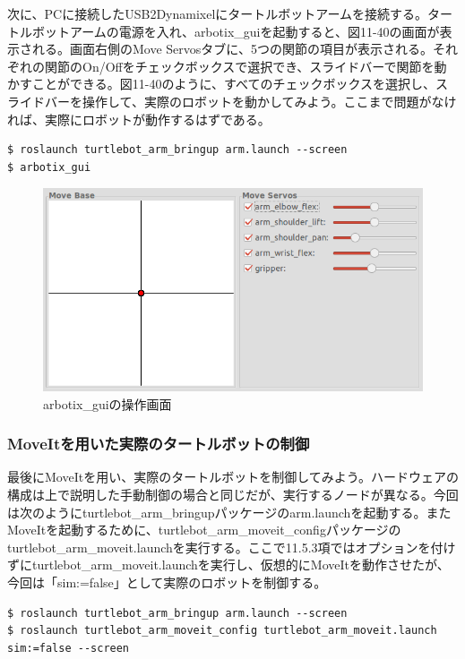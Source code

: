 次に、PCに接続したUSB2Dynamixelにタートルボットアームを接続する。タートルボットアームの電源を入れ、arbotix\_guiを起動すると、図11-40の画面が表示される。画面右側のMove Servosタブに、5つの関節の項目が表示される。それぞれの関節のOn/Offをチェックボックスで選択でき、スライドバーで関節を動かすことができる。図11-40のように、すべてのチェックボックスを選択し、スライドバーを操作して、実際のロボットを動かしてみよう。ここまで問題がなければ、実際にロボットが動作するはずである。

\begin{lstlisting}[language=ROS]
$ roslaunch turtlebot_arm_bringup arm.launch --screen
$ arbotix_gui
\end{lstlisting}

\begin{figure}[htp]
  \centering
  \includegraphics[width=12cm]{pictures/chapter11/pic_11_40.png}
  \caption{arbotix\_guiの操作画面}
\end{figure}

\subsubsection{MoveItを用いた実際のタートルボットの制御}

最後にMoveItを用い、実際のタートルボットを制御してみよう。ハードウェアの構成は上で説明した手動制御の場合と同じだが、実行するノードが異なる。今回は次のようにturtlebot\_arm\_bringupパッケージのarm.launchを起動する。またMoveItを起動するために、turtlebot\_arm\_moveit\_configパッケージのturtlebot\_arm\_moveit.launchを実行する。ここで11.5.3項ではオプションを付けずにturtlebot\_arm\_moveit.launchを実行し、仮想的にMoveItを動作させたが、今回は「sim:=false」として実際のロボットを制御する。

\begin{lstlisting}[language=ROS]
$ roslaunch turtlebot_arm_bringup arm.launch --screen
$ roslaunch turtlebot_arm_moveit_config turtlebot_arm_moveit.launch sim:=false --screen
\end{lstlisting}

